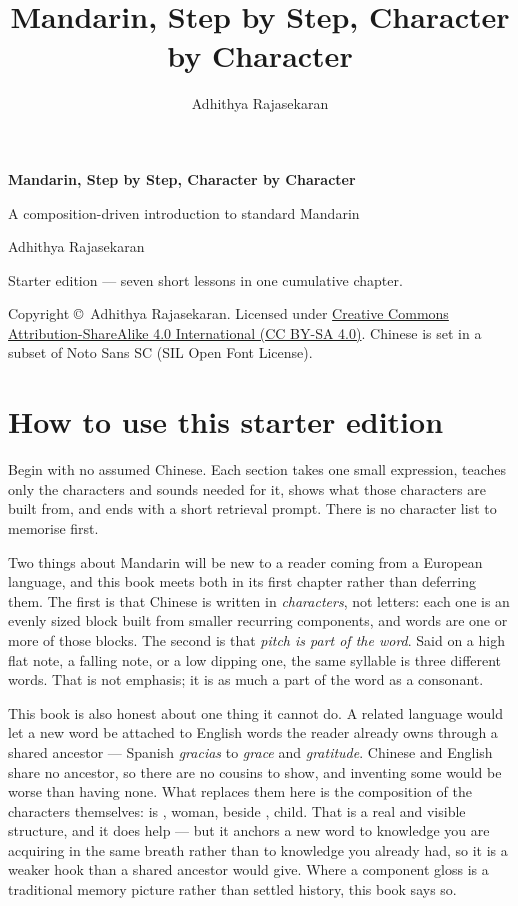\documentclass[11pt,twoside]{book}
\title{\Huge Mandarin, Step by Step, Character by Character}
\author{Adhithya Rajasekaran}
\date{}
\begin{document}
\frontmatter

\begin{titlepage}
  \centering
  \vspace*{3cm}
  {\Huge\bfseries Mandarin, Step by Step, Character by Character\par}
  \vspace{1cm}
  {\Large A composition-driven introduction to standard Mandarin\par}
  \vspace{1.5cm}
  {\large Adhithya Rajasekaran\par}
  \vfill
  {\large Starter edition --- seven short lessons in one cumulative chapter.\par}
  \vspace{2cm}
  {\normalsize
    Copyright \copyright\ Adhithya Rajasekaran. Licensed under
    \href{https://creativecommons.org/licenses/by-sa/4.0/}%
    {Creative Commons Attribution-ShareAlike 4.0 International (CC BY-SA 4.0)}.
    Chinese is set in a subset of Noto Sans SC (SIL Open Font License).\par
  }
\end{titlepage}

\chapter*{How to use this starter edition}

Begin with no assumed Chinese. Each section takes one small expression, teaches
only the characters and sounds needed for it, shows what those characters are
built from, and ends with a short retrieval prompt. There is no character list to
memorise first.

Two things about Mandarin will be new to a reader coming from a European
language, and this book meets both in its first chapter rather than deferring
them. The first is that Chinese is written in \emph{characters}, not letters: each
one is an evenly sized block built from smaller recurring components, and words
are one or more of those blocks. The second is that \emph{pitch is part of the
word}. Said on a high flat note, a falling note, or a low dipping one, the same
syllable is three different words. That is not emphasis; it is as much a part of
the word as a consonant.

This book is also honest about one thing it cannot do. A related language
would let a new word be attached to English words the reader already
owns through a shared ancestor --- Spanish \emph{gracias} to \emph{grace} and
\emph{gratitude}. Chinese and English share no ancestor, so there are no cousins
to show, and inventing some would be worse than having none. What replaces them
here is the composition of the characters themselves:  is , woman,
beside , child. That is a real and visible structure, and it does help ---
but it anchors a new word to knowledge you are acquiring in the same breath
rather than to knowledge you already had, so it is a weaker hook than a shared
ancestor would give. Where a component gloss is a traditional memory picture rather
than settled history, this book says so.
\end{document}
